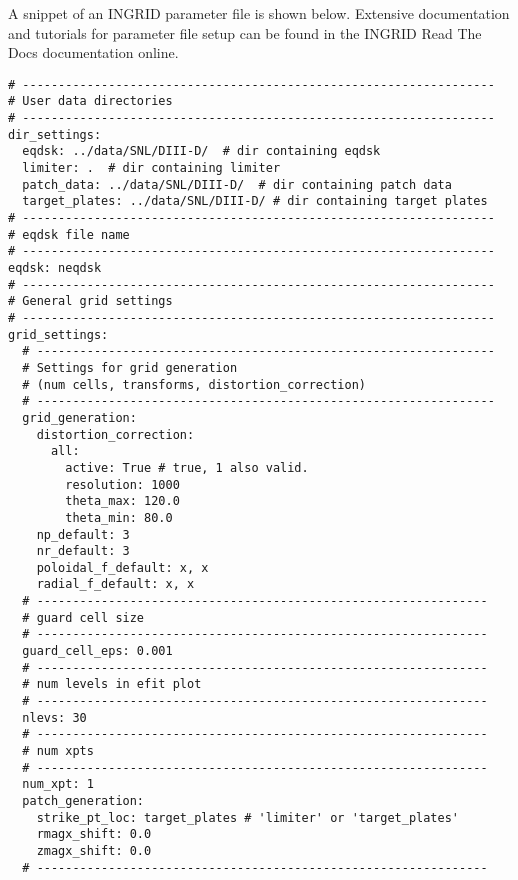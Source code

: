 \onecolumngrid
A snippet of an INGRID parameter file is shown below. Extensive documentation and tutorials for parameter file setup can be found in the INGRID Read The Docs documentation online.
\begin{lstlisting}[basicstyle=\small, aboveskip=\bigskipamount, frame=single, captionpos=b, caption={Snippet of YAML formatted configuration file. YAML files utilize Python formatted comments, keyword-value mappings, and nesting of structures via indentation.}]
# ------------------------------------------------------------------
# User data directories
# ------------------------------------------------------------------
dir_settings:
  eqdsk: ../data/SNL/DIII-D/  # dir containing eqdsk
  limiter: .  # dir containing limiter
  patch_data: ../data/SNL/DIII-D/  # dir containing patch data
  target_plates: ../data/SNL/DIII-D/ # dir containing target plates
# ------------------------------------------------------------------
# eqdsk file name
# ------------------------------------------------------------------
eqdsk: neqdsk
# ------------------------------------------------------------------
# General grid settings
# ------------------------------------------------------------------
grid_settings:
  # ----------------------------------------------------------------
  # Settings for grid generation 
  # (num cells, transforms, distortion_correction)
  # ----------------------------------------------------------------
  grid_generation:
    distortion_correction:
      all:
        active: True # true, 1 also valid.
        resolution: 1000
        theta_max: 120.0
        theta_min: 80.0
    np_default: 3
    nr_default: 3
    poloidal_f_default: x, x
    radial_f_default: x, x
  # ---------------------------------------------------------------
  # guard cell size
  # ---------------------------------------------------------------
  guard_cell_eps: 0.001
  # ---------------------------------------------------------------
  # num levels in efit plot
  # ---------------------------------------------------------------
  nlevs: 30
  # ---------------------------------------------------------------
  # num xpts
  # ---------------------------------------------------------------
  num_xpt: 1
  patch_generation:
    strike_pt_loc: target_plates # 'limiter' or 'target_plates'
    rmagx_shift: 0.0
    zmagx_shift: 0.0
  # ---------------------------------------------------------------

\end{lstlisting}
